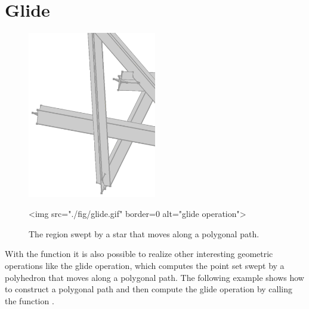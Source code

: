 \section{Glide}

\begin{figure}
  \begin{center}
    \begin{ccTexOnly}
      \includegraphics[width=0.5\textwidth]{Minkowski_sum_3/fig/glide}

  \end{ccTexOnly}
  \begin{ccHtmlOnly}
    <img src="./fig/glide.gif" border=0 alt="glide operation">
  \end{ccHtmlOnly}
    \end{center}
  \caption{The region swept by a star that moves along a polygonal path.}
\end{figure}

With the function  it is also possible to realize
other interesting geometric operations like the glide operation, which
computes the point set swept by a polyhedron that moves along a
polygonal path. The following example shows how to construct a
polygonal path and then compute the glide operation by calling the
function .

